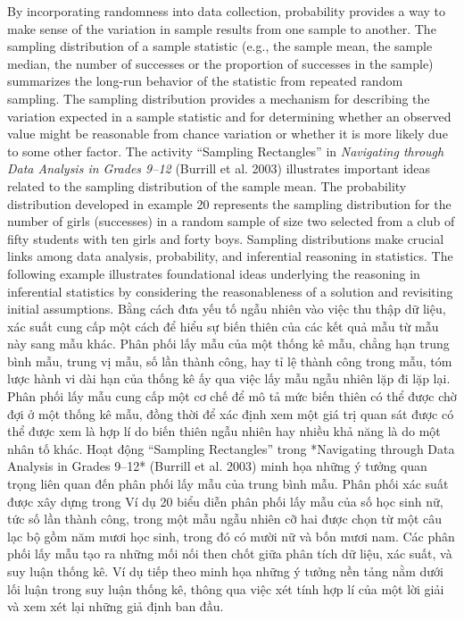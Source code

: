 \documentclass[
  10pt,
  a4paper,
  landscape,
  twoside,
  openany
]{scrbook}
\newcommand{\EN}[1]{#1}
\newcommand{\VI}[1]{#1}
\newcounter{example}
\begin{document}
\TriPara
{
\EN{By incorporating randomness into data collection, probability provides a way to make sense of the variation in sample results from one sample to another. The sampling distribution of a sample statistic (e.g., the sample mean, the sample median, the number of successes or the proportion of successes in the sample) summarizes the long-run behavior of the statistic from repeated random sampling. The sampling distribution provides a mechanism for describing the variation expected in a sample statistic and for determining whether an observed value might be reasonable from chance variation or whether it is more likely due to some other factor. The activity “Sampling Rectangles” in \emph{Navigating through Data Analysis in Grades 9--12} (Burrill et al. 2003) illustrates important ideas related to the sampling distribution of the sample mean. The probability distribution developed in example 20 represents the sampling distribution for the number of girls (successes) in a random sample of size two selected from a club of fifty students with ten girls and forty boys. Sampling distributions make crucial links among data analysis, probability, and inferential reasoning in statistics. The following example illustrates foundational ideas underlying the reasoning in inferential statistics by considering the reasonableness of a solution and revisiting initial assumptions.}
}
{
\VI{Bằng cách đưa yếu tố ngẫu nhiên vào việc thu thập dữ liệu, xác suất cung cấp một cách để hiểu sự biến thiên của các kết quả mẫu từ mẫu này sang mẫu khác. Phân phối lấy mẫu của một thống kê mẫu, chẳng hạn trung bình mẫu, trung vị mẫu, số lần thành công, hay tỉ lệ thành công trong mẫu, tóm lược hành vi dài hạn của thống kê ấy qua việc lấy mẫu ngẫu nhiên lặp đi lặp lại. Phân phối lấy mẫu cung cấp một cơ chế để mô tả mức biến thiên có thể được chờ đợi ở một thống kê mẫu, đồng thời để xác định xem một giá trị quan sát được có thể được xem là hợp lí do biến thiên ngẫu nhiên hay nhiều khả năng là do một nhân tố khác. Hoạt động “Sampling Rectangles” trong *Navigating through Data Analysis in Grades 9--12* (Burrill et al. 2003) minh họa những ý tưởng quan trọng liên quan đến phân phối lấy mẫu của trung bình mẫu. Phân phối xác suất được xây dựng trong Ví dụ 20 biểu diễn phân phối lấy mẫu của số học sinh nữ, tức số lần thành công, trong một mẫu ngẫu nhiên cỡ hai được chọn từ một câu lạc bộ gồm năm mươi học sinh, trong đó có mười nữ và bốn mươi nam. Các phân phối lấy mẫu tạo ra những mối nối then chốt giữa phân tích dữ liệu, xác suất, và suy luận thống kê. Ví dụ tiếp theo minh họa những ý tưởng nền tảng nằm dưới lối luận trong suy luận thống kê, thông qua việc xét tính hợp lí của một lời giải và xem xét lại những giả định ban đầu.}
}
\end{document}
